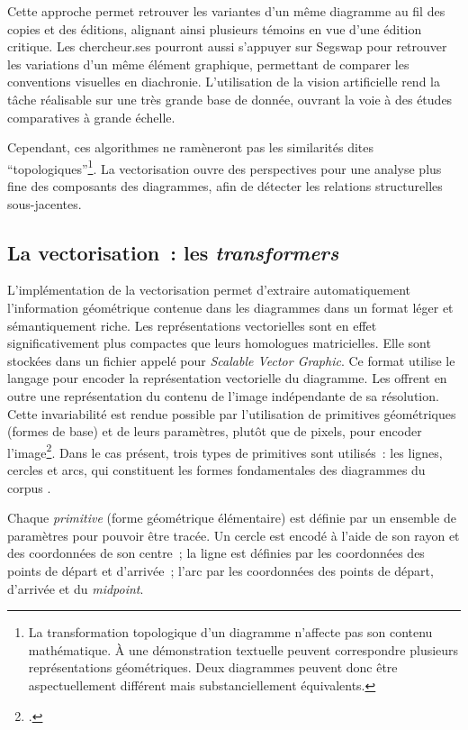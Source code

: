 Cette approche permet retrouver les variantes d'un même diagramme au fil
des copies et des éditions, alignant ainsi plusieurs témoins en vue
d'une édition critique. Les chercheur.ses pourront aussi s'appuyer sur
Segswap pour retrouver les variations d'un même élément graphique,
permettant de comparer les conventions visuelles en diachronie.
L'utilisation de la vision artificielle rend la tâche réalisable sur une
très grande base de donnée, ouvrant la voie à des études comparatives à
grande échelle.

Cependant, ces algorithmes ne ramèneront pas les similarités dites
``topologiques''\footnote{La transformation topologique d'un diagramme
  n'affecte pas son contenu mathématique. À une démonstration textuelle
  peuvent correspondre plusieurs représentations géométriques. Deux
  diagrammes peuvent donc être aspectuellement différent mais
  substanciellement équivalents.}. La vectorisation ouvre des
perspectives pour une analyse plus fine des composants des diagrammes,
afin de détecter les relations structurelles sous-jacentes.

\hypertarget{la-vectorisation-les-transformers}{%
\subsection{La vectorisation~: les
\emph{transformers}}\label{la-vectorisation-les-transformers}}

L'implémentation de la vectorisation permet d'extraire automatiquement
l'information géométrique contenue dans les diagrammes dans un format
léger et sémantiquement riche. Les représentations vectorielles sont en
effet significativement plus compactes que leurs homologues
matricielles. Elle sont stockées dans un fichier appelé \svg pour
\emph{Scalable Vector Graphic}. Ce format utilise le langage \xml pour
encoder la représentation vectorielle du diagramme. Les \svgs offrent en
outre une représentation du contenu de l'image indépendante de sa
résolution. Cette invariabilité est rendue possible par l'utilisation de
primitives géométriques (formes de base) et de leurs paramètres, plutôt
que de pixels, pour encoder l'image\footcite{noauthor_tutoriel_2024}. Dans
le cas présent, trois types de primitives sont utilisés~: les lignes,
cercles et arcs, qui constituent les formes fondamentales des
diagrammes du corpus \eida.

Chaque \emph{primitive} (forme géométrique élémentaire) est définie par
un ensemble de paramètres pour pouvoir être tracée. Un cercle est encodé
à l'aide de son rayon et des coordonnées de son centre~; la ligne est
définies par les coordonnées des points de départ et d'arrivée~; l'arc
par les coordonnées des points de départ, d'arrivée et du
\emph{midpoint}.

